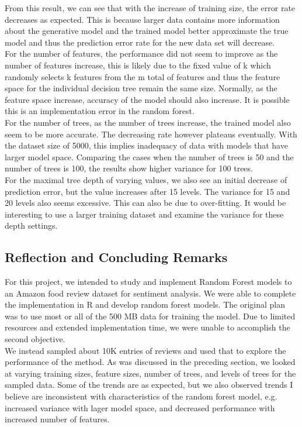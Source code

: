 \documentclass[11pt]{article}
\begin{document}
From this result, we can see that with the increase of training size, the error rate decreases as expected. This is because larger data contains more information about the generative model and the trained model better approximate the true model and thus the prediction error rate for the new data set will decrease.\\

For the number of features, the performance did not seem to improve as the number of features increase, this is likely due to the fixed value of k which randomly selects k features from the m total of features and thus the feature space for the individual decision tree remain the same size. Normally, as the feature space increase, accuracy of the model should also increase. It is possible this is an implementation error in the random forest.\\

For the number of trees, as the number of trees increase, the trained model also seem to be more accurate. The decreasing rate however plateaus eventually. With the dataset size of 5000, this implies inadequacy of data with models that have larger model space. Comparing the cases when the number of trees is 50 and the number of trees is 100, the results show higher variance for 100 trees.\\

For the maximal tree depth of varying values, we also see an initial decrease of prediction error, but the value increases after 15 levels. The variance for 15 and 20 levels also seems excessive. This can also be due to over-fitting. It would be interesting to use a larger training dataset and examine the variance for these depth settings.\\

\subsection{Reflection and Concluding Remarks}
For this project, we intended to study and implement Random Forest models to an Amazon food review dataset for sentiment analysis. We were able to complete the implementation in R and develop random forest models. The original plan was to use most or all of the 500 MB data for training the model. Due to limited resources and extended implementation time, we were unable to accomplish the second objective. \\

We instead sampled about 10K entries of reviews and used that to explore the performance of the method. As was discussed in the preceding section, we looked at varying training sizes, feature sizes, number of trees, and levels of trees for the sampled data. Some of the trends are as expected, but we also observed trends I believe are inconsistent with characteristics of the random forest model, e.g. increased variance with lager model space, and decreased performance with increased number of features. \\
\end{document}
